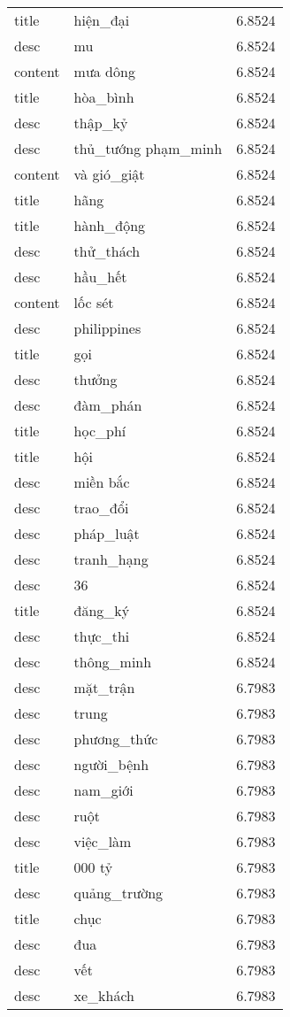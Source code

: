 \documentclass{article}
\begin{document}
\begin{tabular}{lll}
title & hiện\_đại & 6.8524\\
desc & mu & 6.8524\\
content & mưa dông & 6.8524\\
title & hòa\_bình & 6.8524\\
desc & thập\_kỷ & 6.8524\\
desc & thủ\_tướng phạm\_minh & 6.8524\\
content & và gió\_giật & 6.8524\\
title & hãng & 6.8524\\
title & hành\_động & 6.8524\\
desc & thử\_thách & 6.8524\\
desc & hầu\_hết & 6.8524\\
content & lốc sét & 6.8524\\
desc & philippines & 6.8524\\
title & gọi & 6.8524\\
desc & thưởng & 6.8524\\
desc & đàm\_phán & 6.8524\\
title & học\_phí & 6.8524\\
title & hội & 6.8524\\
desc & miền bắc & 6.8524\\
desc & trao\_đổi & 6.8524\\
desc & pháp\_luật & 6.8524\\
desc & tranh\_hạng & 6.8524\\
desc & 36 & 6.8524\\
title & đăng\_ký & 6.8524\\
desc & thực\_thi & 6.8524\\
desc & thông\_minh & 6.8524\\
desc & mặt\_trận & 6.7983\\
desc & trung & 6.7983\\
desc & phương\_thức & 6.7983\\
desc & người\_bệnh & 6.7983\\
desc & nam\_giới & 6.7983\\
desc & ruột & 6.7983\\
desc & việc\_làm & 6.7983\\
title & 000 tỷ & 6.7983\\
desc & quảng\_trường & 6.7983\\
title & chục & 6.7983\\
desc & đua & 6.7983\\
desc & vết & 6.7983\\
desc & xe\_khách & 6.7983\\

\end{tabular}
\end{document}
